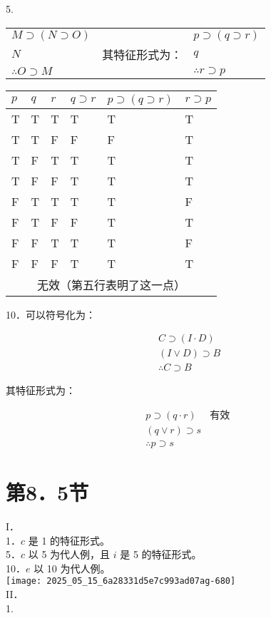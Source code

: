 5.

\begin{center}
\begin{tabular}{lll}
$M \supset(N \supset O)$ &  & $p \supset(q \supset r)$ \\
$N$ & 其特征形式为： & $q$ \\
$\therefore O \supset M$ &  & $\therefore r \supset p$ \\
\end{tabular}
\end{center}

\begin{center}
\begin{tabular}{|l|l|l|l|l|l|}
\hline
$p$ & $q$ & $r$ & $q \supset r$ & $p \supset(q \supset r)$ & $r \supset p$ \\
\hline
T & T & T & T & T & T \\
\hline
T & T & F & F & F & T \\
\hline
T & F & T & T & T & T \\
\hline
T & F & F & T & T & T \\
\hline
F & T & T & T & T & F \\
\hline
F & T & F & F & T & T \\
\hline
F & F & T & T & T & F \\
\hline
F & F & F & T & T & T \\
\hline
\multicolumn{6}{|c|}{无效（第五行表明了这一点）} \\
\hline
\end{tabular}
\end{center}

10．可以符号化为：

$$
\begin{aligned}
& C \supset(I \cdot D) \\
& (I \vee D) \supset B \\
& \therefore C \supset B
\end{aligned}
$$

其特征形式为：

$$
\begin{aligned}
& p \supset(q \cdot r) \quad \text { 有效 } \\
& (q \vee r) \supset s \\
& \therefore p \supset s
\end{aligned}
$$

\section*{第8．5节}
I．\\
1．$c$ 是 1 的特征形式。\\
5．$c$ 以 5 为代人例，且 $i$ 是 5 的特征形式。\\
10．$e$ 以 10 为代人例。\\
\texttt{[image: 2025\_05\_15\_6a28331d5e7c993ad07ag-680]}\\
II．\\
1.


